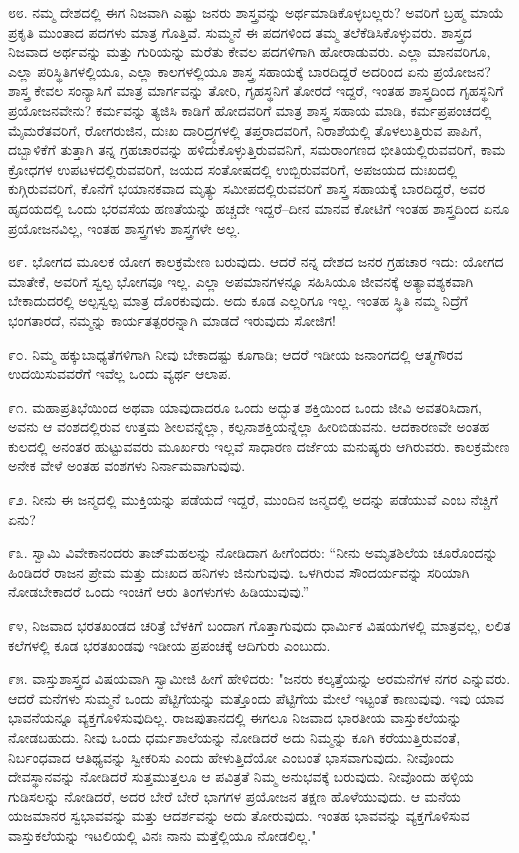 ೮೮. ನಮ್ಮ ದೇಶದಲ್ಲಿ ಈಗ ನಿಜವಾಗಿ ಎಷ್ಟು ಜನರು ಶಾಸ್ತ್ರವನ್ನು ಅರ್ಥಮಾಡಿಕೊಳ್ಳಬಲ್ಲರು? ಅವರಿಗೆ ಬ್ರಹ್ಮ ಮಾಯೆ ಪ್ರಕೃತಿ ಮುಂತಾದ ಪದಗಳು ಮಾತ್ರ ಗೊತ್ತಿವೆ. ಸುಮ್ಮನೆ ಈ ಪದಗಳಿಂದ ತಮ್ಮ ತಲೆಕೆಡಿಸಿಕೊಳ್ಳುವರು. ಶಾಸ್ತ್ರದ ನಿಜವಾದ ಅರ್ಥವನ್ನು ಮತ್ತು ಗುರಿಯನ್ನು ಮರೆತು ಕೇವಲ ಪದಗಳಿಗಾಗಿ ಹೋರಾಡುವರು. ಎಲ್ಲಾ ಮಾನವರಿಗೂ, ಎಲ್ಲಾ ಪರಿಸ್ಥಿತಿಗಳಲ್ಲಿಯೂ, ಎಲ್ಲಾ ಕಾಲಗಳಲ್ಲಿಯೂ ಶಾಸ್ತ್ರ ಸಹಾಯಕ್ಕೆ ಬಾರದಿದ್ದರೆ ಅದರಿಂದ ಏನು ಪ್ರಯೋಜನ? ಶಾಸ್ತ್ರ ಕೇವಲ ಸಂನ್ಯಾಸಿಗೆ ಮಾತ್ರ ಮಾರ್ಗವನ್ನು ತೋರಿ, ಗೃಹಸ್ಥನಿಗೆ ತೋರದೆ ಇದ್ದರೆ, ಇಂತಹ ಶಾಸ್ತ್ರದಿಂದ ಗೃಹಸ್ಥನಿಗೆ ಪ್ರಯೋಜನವೇನು? ಕರ್ಮವನ್ನು ತ್ಯಜಿಸಿ ಕಾಡಿಗೆ ಹೋದವರಿಗೆ ಮಾತ್ರ ಶಾಸ್ತ್ರ ಸಹಾಯ ಮಾಡಿ, ಕರ್ಮಪ್ರಪಂಚದಲ್ಲಿ ಮೈಮರೆತವರಿಗೆ, ರೋಗರುಜಿನ, ದುಃಖ ದಾರಿದ್ರ್ಯಗಳಲ್ಲಿ ತಪ್ತರಾದವರಿಗೆ, ನಿರಾಶೆಯಲ್ಲಿ ತೊಳಲುತ್ತಿರುವ ಪಾಪಿಗೆ, ದಬ್ಬಾಳಿಕೆಗೆ ತುತ್ತಾಗಿ ತನ್ನ ಗ್ರಹಚಾರವನ್ನು ಹಳಿದುಕೊಳ್ಳುತ್ತಿರುವವನಿಗೆ, ಸಮರಾಂಗಣದ ಭೀತಿಯಲ್ಲಿರುವವರಿಗೆ, ಕಾಮ ಕ್ರೋಧಗಳ ಉಪಟಳದಲ್ಲಿರುವವರಿಗೆ, ಜಯದ ಸಂತೋಷದಲ್ಲಿ ಉಬ್ಬಿರುವವರಿಗೆ, ಅಪಜಯದ ದುಃಖದಲ್ಲಿ ಕುಗ್ಗಿರುವವರಿಗೆ, ಕೊನೆಗೆ ಭಯಾನಕವಾದ ಮೃತ್ಯು ಸಮೀಪದಲ್ಲಿರುವವರಿಗೆ ಶಾಸ್ತ್ರ ಸಹಾಯಕ್ಕೆ ಬಾರದಿದ್ದರೆ, ಅವರ ಹೃದಯದಲ್ಲಿ ಒಂದು ಭರವಸೆಯ ಹಣತೆಯನ್ನು ಹಚ್ಚದೇ ಇದ್ದರೆ–ದೀನ ಮಾನವ ಕೋಟಿಗೆ ಇಂತಹ ಶಾಸ್ತ್ರದಿಂದ ಏನೂ ಪ್ರಯೋಜನವಿಲ್ಲ, ಇಂತಹ ಶಾಸ್ತ್ರಗಳು ಶಾಸ್ತ್ರಗಳೇ ಅಲ್ಲ.

೮೯. ಭೋಗದ ಮೂಲಕ ಯೋಗ ಕಾಲಕ್ರಮೇಣ ಬರುವುದು. ಆದರೆ ನನ್ನ ದೇಶದ ಜನರ ಗ್ರಹಚಾರ ಇದು: ಯೋಗದ ಮಾತೇಕೆ, ಅವರಿಗೆ ಸ್ವಲ್ಪ ಭೋಗವೂ ಇಲ್ಲ. ಎಲ್ಲಾ ಅಪಮಾನಗಳನ್ನೂ ಸಹಿಸಿಯೂ ಜೀವನಕ್ಕೆ ಅತ್ಯಾವಶ್ಯಕವಾಗಿ ಬೇಕಾದುದರಲ್ಲಿ ಅಲ್ಪಸ್ವಲ್ಪ ಮಾತ್ರ ದೊರಕುವುದು. ಅದು ಕೂಡ ಎಲ್ಲರಿಗೂ ಇಲ್ಲ. ಇಂತಹ ಸ್ಥಿತಿ ನಮ್ಮ ನಿದ್ರೆಗೆ ಭಂಗತಾರದೆ, ನಮ್ಮನ್ನು ಕಾರ್ಯತತ್ಪರರನ್ನಾಗಿ ಮಾಡದೆ ಇರುವುದು ಸೋಜಿಗ!

೯೦. ನಿಮ್ಮ ಹಕ್ಕುಬಾಧ್ಯತೆಗಳಿಗಾಗಿ ನೀವು ಬೇಕಾದಷ್ಟು ಕೂಗಾಡಿ; ಆದರೆ ಇಡೀಯ ಜನಾಂಗದಲ್ಲಿ ಆತ್ಮಗೌರವ ಉದಯಿಸುವವರೆಗೆ ಇವೆಲ್ಲ ಒಂದು ವ್ಯರ್ಥ ಆಲಾಪ.

೯೧. ಮಹಾಪ್ರತಿಭೆಯಿಂದ ಅಥವಾ ಯಾವುದಾದರೂ ಒಂದು ಅದ್ಭುತ ಶಕ್ತಿಯಿಂದ ಒಂದು ಜೀವಿ ಅವತರಿಸಿದಾಗ, ಅವನು ಆ ವಂಶದಲ್ಲಿರುವ ಉತ್ತಮ ಶೀಲವನ್ನೆಲ್ಲಾ, ಕಲ್ಪನಾಶಕ್ತಿಯನ್ನೆಲ್ಲಾ ಹೀರಿಬಿಡುವನು. ಆದಕಾರಣವೇ ಅಂತಹ ಕುಲದಲ್ಲಿ ಅನಂತರ ಹುಟ್ಟುವವರು ಮೂರ್ಖರು ಇಲ್ಲವೆ ಸಾಧಾರಣ ದರ್ಜೆಯ ಮನುಷ್ಯರು ಆಗಿರುವರು. ಕಾಲಕ್ರಮೇಣ ಅನೇಕ ವೇಳೆ ಅಂತಹ ವಂಶಗಳು ನಿರ್ನಾಮವಾಗುವುವು.

೯೨. ನೀನು ಈ ಜನ್ಮದಲ್ಲಿ ಮುಕ್ತಿಯನ್ನು ಪಡೆಯದೆ ಇದ್ದರೆ, ಮುಂದಿನ ಜನ್ಮದಲ್ಲಿ ಅದನ್ನು ಪಡೆಯುವೆ ಎಂಬ ನೆಚ್ಚಿಗೆ ಏನು?

೯೩. ಸ್ವಾಮಿ ವಿವೇಕಾನಂದರು ತಾಜ್‌ಮಹಲನ್ನು ನೋಡಿದಾಗ ಹೀಗೆಂದರು: “ನೀನು ಅಮೃತಶಿಲೆಯ ಚೂರೊಂದನ್ನು ಹಿಂಡಿದರೆ ರಾಜನ ಪ್ರೇಮ ಮತ್ತು ದುಃಖದ ಹನಿಗಳು ಜಿನುಗುವುವು. ಒಳಗಿರುವ ಸೌಂದರ್ಯವನ್ನು ಸರಿಯಾಗಿ ನೋಡಬೇಕಾದರೆ ಒಂದು ಇಂಚಿಗೆ ಆರು ತಿಂಗಳುಗಳು ಹಿಡಿಯುವುವು.”

೯೪, ನಿಜವಾದ ಭರತಖಂಡದ ಚರಿತ್ರೆ ಬೆಳಕಿಗೆ ಬಂದಾಗ ಗೊತ್ತಾಗುವುದು ಧಾರ್ಮಿಕ ವಿಷಯಗಳಲ್ಲಿ ಮಾತ್ರವಲ್ಲ, ಲಲಿತ ಕಲೆಗಳಲ್ಲಿ ಕೂಡ ಭರತಖಂಡವು ಇಡೀಯ ಪ್ರಪಂಚಕ್ಕೆ ಆದಿಗುರು ಎಂಬುದು.

೯೫. ವಾಸ್ತುಶಾಸ್ತ್ರದ  ವಿಷಯವಾಗಿ ಸ್ವಾಮೀಜಿ ಹೀಗೆ ಹೇಳಿದರು: "ಜನರು ಕಲ್ಕತ್ತೆಯನ್ನು ಅರಮನೆಗಳ ನಗರ ಎನ್ನುವರು. ಆದರೆ ಮನೆಗಳು ಸುಮ್ಮನೆ ಒಂದು ಪೆಟ್ಟಿಗೆಯನ್ನು ಮತ್ತೊಂದು ಪೆಟ್ಟಿಗೆಯ ಮೇಲೆ ಇಟ್ಟಂತೆ ಕಾಣುವುವು. ಇವು ಯಾವ ಭಾವನೆಯನ್ನೂ ವ್ಯಕ್ತಗೊಳಿಸುವುದಿಲ್ಲ. ರಾಜಪುತಾನದಲ್ಲಿ ಈಗಲೂ ನಿಜವಾದ ಭಾರತೀಯ ವಾಸ್ತುಕಲೆಯನ್ನು ನೋಡಬಹುದು. ನೀವು ಒಂದು ಧರ್ಮಶಾಲೆಯನ್ನು ನೋಡಿದರೆ ಅದು ನಿಮ್ಮನ್ನು ಕೂಗಿ ಕರೆಯುತ್ತಿರುವಂತೆ, ನಿರ್ಬಂಧವಾದ ಆತಿಥ್ಯವನ್ನು ಸ್ವೀಕರಿಸು ಎಂದು ಹೇಳುತ್ತಿದೆಯೋ ಎಂಬಂತೆ ಭಾಸವಾಗುವುದು. ನೀವೊಂದು ದೇವಸ್ಥಾನವನ್ನು ನೋಡಿದರೆ ಸುತ್ತಮುತ್ತಲೂ ಆ ಪವಿತ್ರತೆ ನಿಮ್ಮ ಅನುಭವಕ್ಕೆ ಬರುವುದು. ನೀವೊಂದು ಹಳ್ಳಿಯ ಗುಡಿಸಲನ್ನು ನೋಡಿದರೆ, ಅದರ ಬೇರೆ ಬೇರೆ ಭಾಗಗಳ ಪ್ರಯೋಜನ ತಕ್ಷಣ ಹೊಳೆಯುವುದು. ಆ ಮನೆಯ ಯಜಮಾನರ ಸ್ವಭಾವವನ್ನು ಮತ್ತು ಆದರ್ಶವನ್ನು ಅದು ತೋರುವುದು. ಇಂತಹ ಭಾವವನ್ನು ವ್ಯಕ್ತಗೊಳಿಸುವ ವಾಸ್ತುಕಲೆಯನ್ನು ಇಟಲಿಯಲ್ಲಿ ವಿನಃ ನಾನು ಮತ್ತೆಲ್ಲಿಯೂ ನೋಡಲಿಲ್ಲ."

